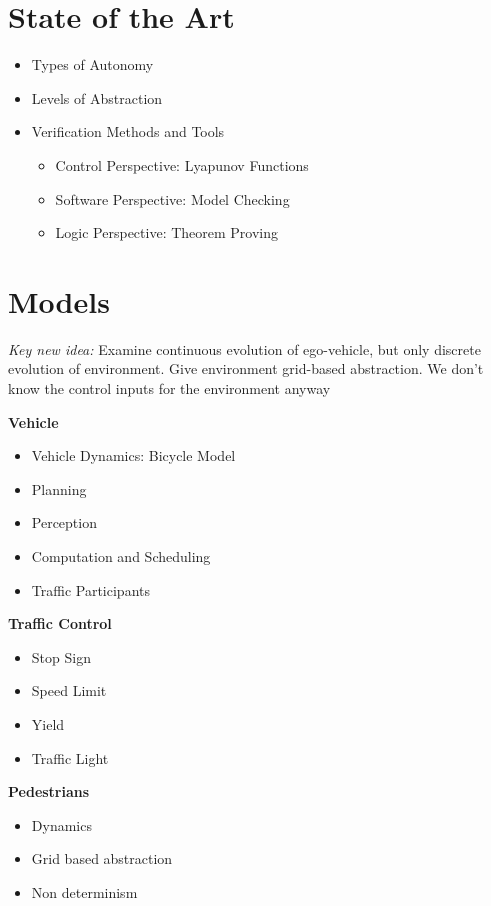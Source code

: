 \documentclass{easychair}
\begin{document}
\section{State of the Art}
\begin{itemize}
	\item Types of Autonomy
	\item Levels of Abstraction
	\item Verification Methods and Tools
	\begin{itemize}
		\item Control Perspective: Lyapunov Functions
		\item Software Perspective: Model Checking
		\item Logic Perspective: Theorem Proving
	\end{itemize}
\end{itemize}
\section{Models}
\label{sect:model}
\emph{Key new idea:} Examine continuous evolution of ego-vehicle, but only discrete evolution of environment. Give environment grid-based abstraction. We don't know the control inputs for the environment anyway\newline

\noindent \textbf{Vehicle}
\begin{itemize}
	\item Vehicle Dynamics: Bicycle Model
	\item Planning
	\item Perception
	\item Computation and Scheduling
	\item Traffic Participants
\end{itemize}

\noindent \textbf{Traffic Control}
\begin{itemize}
	\item Stop Sign
	\item Speed Limit
	\item Yield
	\item Traffic Light
\end{itemize}

\noindent \textbf{Pedestrians}
\begin{itemize}
	\item Dynamics
	\item Grid based abstraction
	\item Non determinism
\end{itemize}
\end{document}
